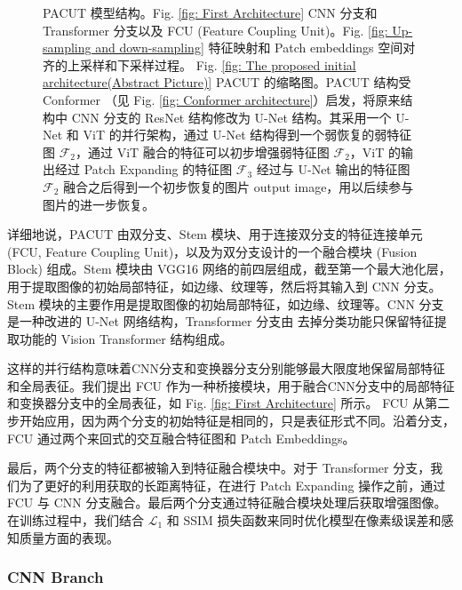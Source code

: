 \documentclass[a4paper]{ctexart}
\begin{document}
\begin{figure}[htb]
		\captionsetup{font=scriptsize}
		\caption{
			\label{fig: PACUT}
			PACUT 模型结构。Fig. \ref{fig: First Architecture} CNN 分支和 Transformer 分支以及 FCU (Feature Coupling Unit)。Fig. \ref{fig: Up-sampling and down-sampling} 特征映射和 Patch embeddings 空间对齐的上采样和下采样过程。 Fig. \ref{fig: The proposed initial architecture(Abstract Picture)} PACUT 的缩略图。PACUT 结构受 Conformer\cite{peng2021conformer} （见 Fig. \ref{fig: Conformer architecture}）启发，将原来结构中 CNN 分支的 ResNet 结构修改为 U-Net 结构。其采用一个 U-Net 和 ViT 的并行架构，通过 U-Net 结构得到一个弱恢复的弱特征图 $\mathcal{F}_2$，通过 ViT 融合的特征可以初步增强弱特征图 $\mathcal{F}_2$，ViT 的输出经过 Patch Expanding 的特征图 $\mathcal{F}_3$ 经过与 U-Net 输出的特征图 $\mathcal{F}_2$ 融合之后得到一个初步恢复的图片 output image，用以后续参与图片的进一步恢复。
		}
	\end{figure}
	
	详细地说，PACUT 由双分支、Stem 模块、用于连接双分支的特征连接单元 (FCU, Feature Coupling Unit)，以及为双分支设计的一个融合模块 (Fusion Block) 组成。Stem 模块由 VGG16 网络的前四层组成，截至第一个最大池化层，用于提取图像的初始局部特征，如边缘、纹理等，然后将其输入到 CNN 分支。
	Stem 模块的主要作用是提取图像的初始局部特征，如边缘、纹理等。CNN 分支是一种改进的 U-Net 网络结构，Transformer 分支由 去掉分类功能只保留特征提取功能的 Vision Transformer 结构组成。 
	
	这样的并行结构意味着CNN分支和变换器分支分别能够最大限度地保留局部特征和全局表征。我们提出 FCU 作为一种桥接模块，用于融合CNN分支中的局部特征和变换器分支中的全局表征，如 Fig. \ref{fig: First Architecture} 所示。 FCU 从第二步开始应用，因为两个分支的初始特征是相同的，只是表征形式不同。沿着分支，FCU 通过两个来回式的交互融合特征图和 Patch Embeddings。
	
	最后，两个分支的特征都被输入到特征融合模块中。对于 Transformer 分支，我们为了更好的利用获取的长距离特征，在进行 Patch Expanding 操作之前，通过 FCU 与 CNN 分支融合。最后两个分支通过特征融合模块处理后获取增强图像。在训练过程中，我们结合 $\mathcal{L}_1$ 和 SSIM 损失函数来同时优化模型在像素级误差和感知质量方面的表现。
	
	
	\subsubsection{CNN Branch}	
	
\end{document}
